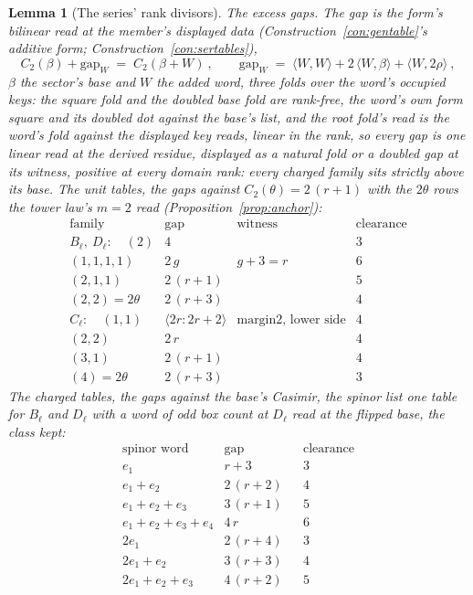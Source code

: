 \documentclass[11pt]{article}
\newtheorem{lemma}{Lemma}
\theoremstyle{definition}
\begin{document}
\begin{lemma}[The series' rank divisors]
\emph{The excess gaps.} The gap is the form's bilinear read at
the member's displayed data (Construction~\ref{con:gentable}'s
additive form; Construction~\ref{con:sertables}),
\[
C_2(\beta)+\mathrm{gap}_W\;=\;C_2(\beta+W)\ ,
\qquad
\mathrm{gap}_W\;=\;\langle W,W\rangle+2\,\langle W,\beta\rangle
+\langle W,2\rho\rangle\ ,
\]
$\beta$ the sector's base and $W$ the added word, three folds
over the word's occupied keys: the square fold and the doubled
base fold are rank-free, the word's own form square and its
doubled dot against the base's list, and the root fold's read is
the word's fold against the displayed key reads, linear in the
rank, so every gap is one linear read at the derived residue,
displayed as a natural fold or a doubled gap at its witness,
positive at every domain rank: every charged family sits strictly
above its base. The unit tables, the gaps against
$C_2(\theta)=2\,(r+1)$ with the $2\theta$ rows the tower law's
$m=2$ read (Proposition~\ref{prop:anchor}):
\[
\begin{array}{llll}
\text{family} & \mathrm{gap} & \text{witness} & \text{clearance}\\
\hline
B_\ell,\ D_\ell:\quad(2) & 4 & & 3\\
(1,1,1,1) & 2\,g & g+3=r & 6\\
(2,1,1) & 2\,(r+1) & & 5\\
(2,2)=2\theta & 2\,(r+3) & & 4\\[2pt]
C_\ell:\quad(1,1) & \langle 2r\!:\!2r+2\rangle & \text{margin
$2$, lower side} & 4\\
(2,2) & 2\,r & & 4\\
(3,1) & 2\,(r+1) & & 4\\
(4)=2\theta & 2\,(r+3) & & 3
\end{array}
\]
The charged tables, the gaps against the base's Casimir, the
spinor list one table for $B_\ell$ and $D_\ell$ with a word of
odd box count at $D_\ell$ read at the flipped base, the class
kept:
\[
\begin{array}{llll}
\text{spinor word} & \mathrm{gap} & & \text{clearance}\\
\hline
e_1 & r+3 & & 3\\
e_1{+}e_2 & 2\,(r+2) & & 4\\
e_1{+}e_2{+}e_3 & 3\,(r+1) & & 5\\
e_1{+}e_2{+}e_3{+}e_4 & 4\,r & & 6\\
2e_1 & 2\,(r+4) & & 3\\
2e_1{+}e_2 & 3\,(r+3) & & 4\\
2e_1{+}e_2{+}e_3 & 4\,(r+2) & & 5\\

\end{array}\]
\end{lemma}
\end{document}

